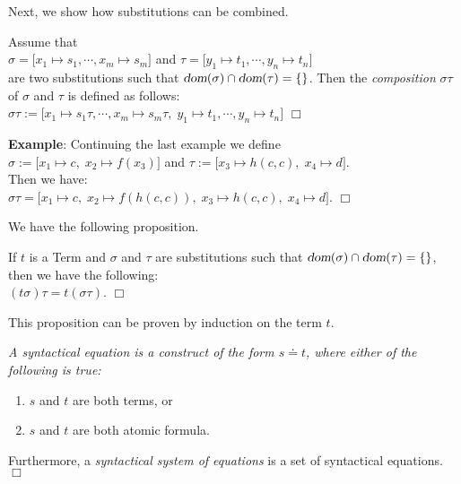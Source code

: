 \noindent
Next, we show how substitutions can be combined.
\begin{Definition} 
Assume that
\\[0.2cm]
\hspace*{1.3cm} 
$\sigma = \big[ x_1 \mapsto s_1, \cdots, x_m \mapsto s_m \big]$ \quad and \quad
$\tau = \big[ y_1 \mapsto t_1, \cdots, y_n \mapsto t_n \big]$ 
\\[0.2cm]
are two substitutions such that  $\textsl{dom}(\sigma) \cap \textsl{dom}(\tau) =
\{\}$. Then the \emph{composition}
$\sigma\tau$ of $\sigma$ and $\tau$ is defined as follows: \\[0.2cm]
\hspace*{1.3cm} $\sigma\tau := \big[ x_1 \mapsto s_1\tau, \cdots, x_m \mapsto s_m\tau,\; y_1 \mapsto t_1, \cdots, y_n \mapsto t_n \big]$
\hspace*{\fill} $\Box$
\end{Definition}

\noindent
\textbf{Example}:  Continuing the last example we define \\[0.2cm]
\hspace*{1.3cm} $\sigma := \big[ x_1 \mapsto c,\; x_2 \mapsto f(x_3) \big]$
                \quad and \quad $\tau := \big[ x_3 \mapsto h(c,c),\; x_4 \mapsto d \big]$. \\[0.2cm]
Then we have: \\[0.2cm]
\hspace*{1.3cm} $ \sigma\tau = \big[ x_1 \mapsto c,\; x_2 \mapsto f(h(c,c)),\; x_3 \mapsto h(c,c),\;x_4 \mapsto d \big]$.
\hspace*{\fill} $\Box$
\vspace{0.3cm}

\noindent
We have the following proposition.

\begin{Proposition} \label{satz:komposition}
If  $t$ is a  Term and $\sigma$ and $\tau$ are  substitutions such that
$\textsl{dom}(\sigma) \cap \textsl{dom}(\tau) = \{\}$, then we have the following: \\[0.2cm]
\hspace*{1.3cm} $(t \sigma)\tau = t (\sigma\tau)$.
\hspace*{\fill} $\Box$
\end{Proposition}
This proposition can be proven by induction on the term $t$.


\begin{Definition}
{\em
A  \emph{syntactical equation} is a construct of the form
$s \doteq t$, where either of the following is true:
\begin{enumerate}
\item $s$ and $t$ are both terms, or
\item $s$ and $t$ are both atomic formula.
\end{enumerate}
Furthermore, a \emph{syntactical system of equations} is a set of syntactical equations.
\hspace*{\fill} $\Box$
}
\end{Definition}

